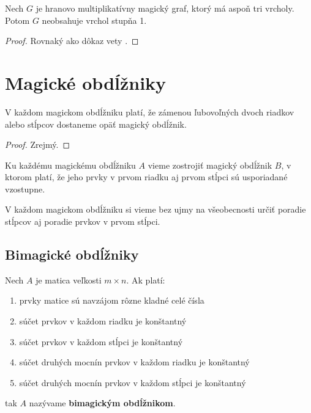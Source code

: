 \begin{subtheorem} Nech $G$ je hranovo multiplikatívny magický graf, ktorý má aspoň tri vrcholy. Potom $G$ neobsahuje vrchol stupňa 1.
\end{subtheorem}

\begin{proof} Rovnaký ako dôkaz vety \label{hbgdegree1}.
\end{proof} 

\section{Magické obdĺžniky}

\begin{theorem} V každom magickom obdĺžniku platí, že zámenou ľubovoľných dvoch riadkov alebo stĺpcov dostaneme opäť magický obdĺžnik.
\end{theorem}

\begin{proof}
Zrejmý.
\end{proof}

\begin{consequence} Ku každému magickému obdĺžniku $A$ vieme zostrojiť magický obdĺžnik $B$, v ktorom platí, že jeho prvky v prvom riadku aj prvom stĺpci sú usporiadané vzostupne.
\end{consequence}

\begin{consequence}
\label{rectangleorder}
V každom magickom obdĺžniku si vieme bez ujmy na všeobecnosti určiť poradie stĺpcov aj poradie prvkov v prvom stĺpci.
\end{consequence}

\subsection{Bimagické obdĺžniky}

\begin{subdefinition} Nech $A$ je matica veľkosti $m \times n$. Ak platí:

\begin{enumerate}
\item prvky matice sú navzájom rôzne kladné celé čísla
\item súčet prvkov v každom riadku je konštantný
\item súčet prvkov v každom stĺpci je konštantný
\item súčet druhých mocnín prvkov v každom riadku je konštantný
\item súčet druhých mocnín prvkov v každom stĺpci je konštantný
\end{enumerate}

tak $A$ nazývame \textbf{bimagickým obdĺžnikom}.
\end{subdefinition} 

